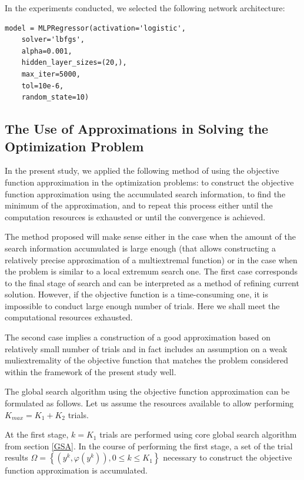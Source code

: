 \documentclass[sensors,article,submit,moreauthors,pdftex]{Definitions/mdpi}
\begin{document}
In the experiments conducted, we selected the following network architecture:
\begin{verbatim}
model = MLPRegressor(activation='logistic',
	solver='lbfgs',
	alpha=0.001,
	hidden_layer_sizes=(20,),
	max_iter=5000,
	tol=10e-6,
	random_state=10)
\end{verbatim}


\subsection{The Use of Approximations in Solving the Optimization Problem}\label{GSA_Appr}

In the present study, we applied the following method of using the objective function approximation in the optimization problems: to construct the objective function approximation using the accumulated search information, to find the minimum of the approximation, and to repeat this process either until the computation resources is exhausted or until the convergence is achieved.

The method proposed will make sense either in the case when the amount of the search information accumulated is large enough (that allows constructing a relatively precise approximation of a multiextremal function) or in the case when the problem is similar to a local extremum search one.
The first case corresponds to the final stage of search and can be interpreted as a method of refining current solution. However, if the objective function is a time-consuming one, it is impossible to conduct large enough number of trials. Here we shall meet the computational resources exhausted.

The second case implies a construction of a good approximation based on relatively small number of trials and in fact includes an assumption on a weak muliextremality of the objective function that matches the problem considered within the framework of the present study well.
 
The global search algorithm using the objective function approximation can be formulated as follows.
Let us assume the resources available to allow performing $K_{max} = K_1 + K_2$ trials.

At the first stage, $k = K_1$ trials are performed using core global search algorithm from section \ref{GSA}.
In the course of performing the first stage, a set of the trial results $\Omega = \left\{(y^k, \varphi(y^k)), 0\leq k\leq K_1\right\}$ necessary to construct the objective function approximation is accumulated.
\end{document}
